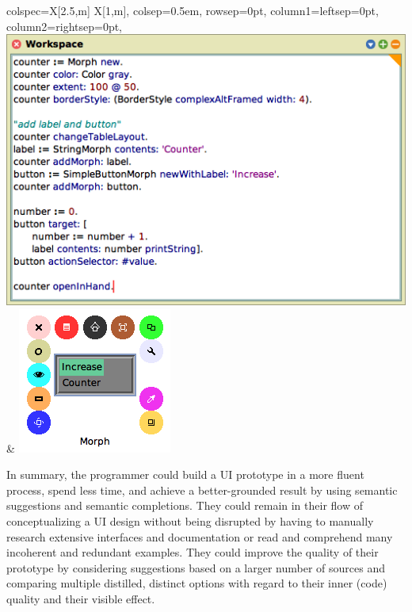\begin{center}
	\begin{tblr}{
		colspec={X[2.5,m] X[1,m]},
		colsep=0.5em,
		rowsep=0pt,
		column{1}={leftsep=0pt},
		column{2}={rightsep=0pt},
	}
		\includegraphics[width=\linewidth,valign=c]{01_suggestions/workspace_final.png} & %
		\includegraphics[width=\linewidth,valign=c]{01_suggestions/app_final.png} %
	\end{tblr}
\end{center}

In summary, the programmer could build a UI prototype in a more fluent process, spend less time, and achieve a better-grounded result by using semantic suggestions and semantic completions.
They could remain in their flow of conceptualizing a UI design without being disrupted by having to manually research extensive interfaces and documentation or read and comprehend many incoherent and redundant examples.
They could improve the quality of their prototype by considering suggestions based on a larger number of sources and comparing multiple distilled, distinct options with regard to their inner (code) quality and their visible effect.
